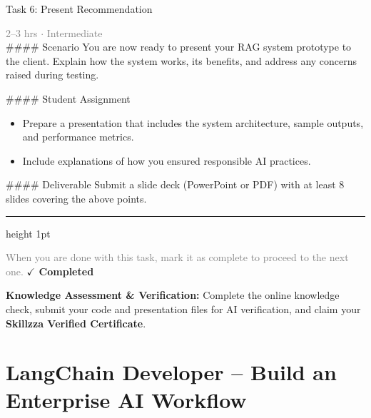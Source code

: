 \documentclass[10pt,a4paper]{article}
\begin{document}
\begin{taskbox}{Task 6: Present Recommendation}

    {\small \textcolor{gray}{2--3 hrs $\cdot$ Intermediate}}\\[12pt]

    \#\#\#\# Scenario  
You are now ready to present your RAG system prototype to the client. Explain how the system works, its benefits, and address any concerns raised during testing.  

\#\#\#\# Student Assignment  
\begin{itemize}
    \item Prepare a presentation that includes the system architecture, sample outputs, and performance metrics.  
    \item Include explanations of how you ensured responsible AI practices.  
\end{itemize}

\#\#\#\# Deliverable  
Submit a slide deck (PowerPoint or PDF) with at least 8 slides covering the above points.\par

    \vspace{16pt}

    \textcolor{cardBorder}{\hrule height 1pt}\vspace{8pt}

    \small \textcolor{gray}{When you are done with this task, mark it as complete to proceed to the next one.} \hfill \textbf{\textcolor{brandDark}{$\checkmark$ Completed}}

\end{taskbox}

\begin{completionbox}
    \textbf{Knowledge Assessment \& Verification:} Complete the online knowledge check, submit your code and presentation files for AI verification, and claim your \textbf{Skillzza Verified Certificate}.
\end{completionbox}

\newpage




\section*{LangChain Developer – Build an Enterprise AI Workflow}
\end{document}
